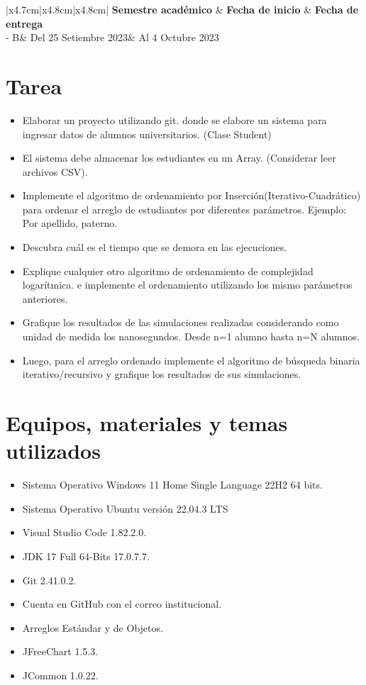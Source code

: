 \documentclass{article}
\newcommand{\itemAcademic}{2023 - B}
\newcommand{\itemInput}{Del 25 Setiembre 2023}
\newcommand{\itemOutput}{Al 4 Octubre 2023}
\begin{document}
	\begin{table}[H]
		\begin{tabular}{|x{4.7cm}|x{4.8cm}|x{4.8cm}|}
			\hline 
			\color{white}\textbf{Semestre académico} & \color{white}\textbf{Fecha de inicio}  & \color{white}\textbf{Fecha de entrega}   \\
			\hline 
			\itemAcademic & \itemInput &  \itemOutput  \\
			\hline 
		\end{tabular}
	\end{table}
	
	\section{Tarea}
	\begin{itemize}		
		\item Elaborar un proyecto utilizando git. donde se elabore un sistema para ingresar datos de alumnos universitarios. (Clase Student)
            \item El sistema debe almacenar los estudiantes en un Array. (Considerar leer archivos CSV).
            \item Implemente el algoritmo de ordenamiento por Inserción(Iterativo-Cuadrático) para ordenar el arreglo de estudiantes por diferentes parámetros. Ejemplo: Por apellido, paterno.
            \item Descubra cuál es el tiempo que se demora en las ejecuciones.
            \item Explique cualquier otro algoritmo de ordenamiento de complejidad logarítmica. e implemente el ordenamiento utilizando los mismo parámetros anteriores.
            \item Grafique los resultados de las simulaciones realizadas considerando como unidad de medida los nanosegundos. Desde n=1 alumno hasta n=N alumnos.
            \item Luego, para el arreglo ordenado implemente el algoritmo de búsqueda binaria iterativo/recursivo y grafique los resultados de sus simulaciones.

	\end{itemize}
		
	\section{Equipos, materiales y temas utilizados}
	\begin{itemize}
		\item Sistema Operativo Windows 11 Home Single Language 22H2 64 bits.
        \item Sistema Operativo Ubuntu versión 22.04.3 LTS
		\item Visual Studio Code 1.82.2.0.
		\item JDK 17 Full 64-Bits 17.0.7.7.
		\item Git 2.41.0.2.
		\item Cuenta en GitHub con el correo institucional.
        \item Arreglos Estándar y de Objetos.
        \item JFreeChart 1.5.3.
        \item JCommon 1.0.22.
	\end{itemize}
	
\end{document}
